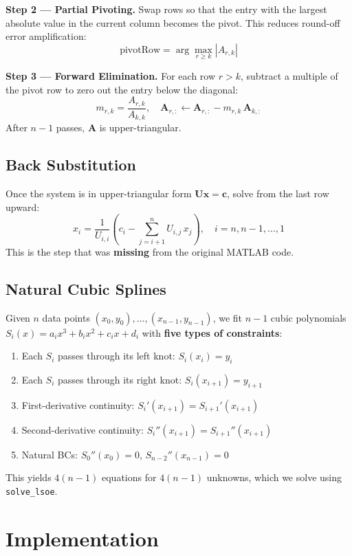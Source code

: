 \documentclass[letterpaper,twocolumn,fleqn]{article}
\begin{document}
\textbf{Step 2 — Partial Pivoting.}
Swap rows so that the entry with the largest absolute value in the
current column becomes the pivot.  This reduces round-off error
amplification:
\[
\text{pivotRow} = \arg\max_{r \ge k} |A_{r,k}|
\]

\textbf{Step 3 — Forward Elimination.}
For each row $r > k$, subtract a multiple of the pivot row to zero
out the entry below the diagonal:
\[
m_{r,k} = \frac{A_{r,k}}{A_{k,k}}, \quad
\mathbf{A}_{r,:} \leftarrow \mathbf{A}_{r,:} - m_{r,k} \,\mathbf{A}_{k,:}
\]
After $n-1$ passes, $\mathbf{A}$ is upper-triangular.

\subsection{Back Substitution}
Once the system is in upper-triangular form $\mathbf{U}\mathbf{x} = \mathbf{c}$,
solve from the last row upward:
\[
x_i = \frac{1}{U_{i,i}}\!\left(c_i - \sum_{j=i+1}^{n} U_{i,j}\,x_j\right),
\quad i = n, n{-}1, \ldots, 1
\]
This is the step that was \textbf{missing} from the original MATLAB code.

\subsection{Natural Cubic Splines}
Given $n$ data points $(x_0, y_0), \ldots, (x_{n-1}, y_{n-1})$,
we fit $n-1$ cubic polynomials
$S_i(x) = a_i x^3 + b_i x^2 + c_i x + d_i$
with \textbf{five types of constraints}:
\begin{enumerate}
  \item Each $S_i$ passes through its left knot: $S_i(x_i) = y_i$
  \item Each $S_i$ passes through its right knot: $S_i(x_{i+1}) = y_{i+1}$
  \item First-derivative continuity: $S_i'(x_{i+1}) = S_{i+1}'(x_{i+1})$
  \item Second-derivative continuity: $S_i''(x_{i+1}) = S_{i+1}''(x_{i+1})$
  \item Natural BCs: $S_0''(x_0) = 0$, $S_{n-2}''(x_{n-1}) = 0$
\end{enumerate}
This yields $4(n-1)$ equations for $4(n-1)$ unknowns, which we solve
using \texttt{solve\_lsoe}.

\section{Implementation}
\end{document}

